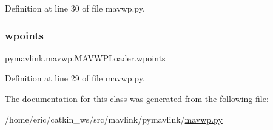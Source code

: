 Definition at line 30 of file mavwp.\+py.

\mbox{\label{classpymavlink_1_1mavwp_1_1MAVWPLoader_af32614c372c60f9a3cb2669e8bdea740}} 
\subsubsection{\texorpdfstring{wpoints}{wpoints}}
{\footnotesize\ttfamily pymavlink.\+mavwp.\+M\+A\+V\+W\+P\+Loader.\+wpoints}



Definition at line 29 of file mavwp.\+py.



The documentation for this class was generated from the following file\+:\begin{DoxyCompactItemize}
\item 
/home/eric/catkin\+\_\+ws/src/mavlink/pymavlink/\mbox{\hyperlink{mavwp_8py}{mavwp.\+py}}\end{DoxyCompactItemize}

